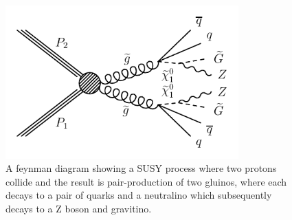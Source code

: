 \begin{figure}[!htb]
  \begin{center}
    \includegraphics[width=0.8\textwidth]{intro/figs/Feynman_graph_T5ZZgmsb.pdf}
    \caption{
      \label{fig:SMS_T5ZZgmsb}
      A feynman diagram showing a SUSY process where two protons collide and the result is pair-production of two gluinos,
      where each decays to a pair of quarks and a neutralino which subsequently decays to a Z boson and gravitino.
    }
  \end{center}
\end{figure}
